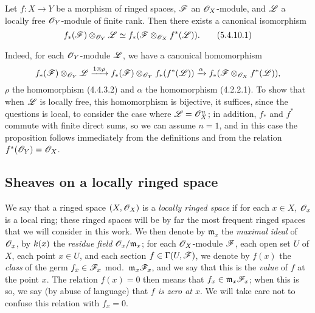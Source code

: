 \begin{env}[5.4.10]
\label{0.5.4.10}
Let $f:X\to Y$ be a morphism of ringed spaces, $\mathscr{F}$ an $\mathscr{O}_X$-module, and $\mathscr{L}$ a locally free $\mathscr{O}_Y$-module of finite rank.
Then there exists a canonical isomorphism
\[
  f_*(\mathscr{F})\otimes_{\mathscr{O}_Y}\mathscr{L}\simeq f_*(\mathscr{F}\otimes_{\mathscr{O}_X}f^*(\mathscr{L})).
  \tag{5.4.10.1}
\]

Indeed, for each $\mathscr{O}_Y$-module $\mathscr{L}$, we have a canonical homomorphism
\[
  f_*(\mathscr{F})\otimes_{\mathscr{O}_Y}\mathscr{L}\xrightarrow{1\otimes\rho}f_*(\mathscr{F})\otimes_{\mathscr{O}_Y}f_*(f^*(\mathscr{L}))\xrightarrow{\alpha}f_*(\mathscr{F}\otimes_{\mathscr{O}_X}f^*(\mathscr{L})),
\]
$\rho$ the homomorphism (4.4.3.2) and $\alpha$ the homomorphism (4.2.2.1).
To show that when $\mathscr{L}$ is locally free, this homomorphism is bijective, it suffices, since the questions is local, to consider the case where $\mathscr{L}=\mathscr{O}_X^n$;
in addition, $f_*$ and $f^*$ commute with finite direct sums, so we can assume $n=1$, and in this case the proposition follows immediately from the definitions and from the relation $f^*(\mathscr{O}_Y)=\mathscr{O}_X$.
\end{env}

\subsection{Sheaves on a locally ringed space}
\label{subsection:0.5.5}

\begin{env}[5.5.1]
\label{0.5.5.1}
We say that a ringed space $(X,\mathscr{O}_X)$ is a \emph{locally ringed space} if for each $x\in X$, $\mathscr{O}_x$ is a local ring;
these ringed spaces will be by far the most frequent ringed spaces that we will consider in this work.
We then denote by $\mathfrak{m}_x$ the \emph{maximal ideal} of $\mathscr{O}_x$, by $k(x)$ the \emph{residue field $\mathscr{O}_x/\mathfrak{m}_x$};
for each $\mathscr{O}_X$-module $\mathscr{F}$, each open set $U$ of $X$, each point $x\in U$, and each section $f\in\Gamma(U,\mathscr{F})$, we denote by $f(x)$ the \emph{class} of the germ $f_x\in\mathscr{F}_x$ mod.~$\mathfrak{m}_x\mathscr{F}_x$, and we say that this is the \emph{value} of $f$ at the point $x$.
The relation $f(x)=0$ then means that $f_x\in\mathfrak{m}_x\mathscr{F}_x$; when this is so, we say (by abuse of language) that \emph{$f$ is zero at $x$}.
We will take care not to confuse this relation with $f_x=0$.
\end{env}

